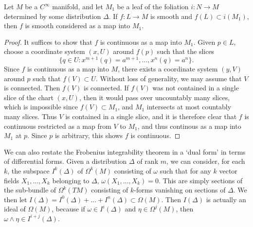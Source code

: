 \begin{theorem}
    Let $M$ be a $C^\infty$ manifold, and let $M_1$ be a leaf of the foliation $i: N \to M$ determined by some distribution $\Delta$. If $f: L \to M$ is smooth and $f(L) \subset i(M_1)$, then $f$ is smooth considered as a map into $M_1$.
\end{theorem}
\begin{proof}
    It suffices to show that $f$ is continuous as a map into $M_1$. Given $p \in L$, choose a coordinate system $(x,U)$ around $f(p)$ such that the slices
    \[ \{ q \in U : x^{m+1}(q) = a^{m+1}, \dots, x^n(q) = a^n \}. \]
    Since $f$ is continuous as a map into $M$, there exists a coordinate system $(y,V)$ around $p$ such that $f(V) \subset U$. Without loss of generality, we may assume that $V$ is connected. Then $f(V)$ is connected. If $f(V)$ was not contained in a single slice of the chart $(x,U)$, then it would pass over uncountably many slices, which is impossible since $f(V) \subset M_1$, and $M_1$ intersects at most countably many slices. Thus $V$ is contained in a single slice, and it is therefore clear that $f$ is continuous restricted as a map from $V$ to $M_1$, and thus continous as a map into $M_1$ at $p$. Since $p$ is arbitrary, this shows $f$ is continuous.
\end{proof}

We can also restate the Frobenius integrability theorem in a `dual form' in terms of differential forms. Given a distribution $\Delta$ of rank $m$, we can consider, for each $k$, the subspace $I^k(\Delta)$ of $\Omega^k(M)$ consisting of $\omega$ such that for any $k$ vector fields $X_1, \dots, X_k$ belonging to $\Delta$, $\omega(X_1, \dots, X_k) = 0$. This are simply sections of the sub-bundle of $\Omega^k(TM)$ consisting of $k$-forms vanishing on sections of $\Delta$. We then let $I(\Delta) = I^0(\Delta) + \dots + I^n(\Delta) \subset \Omega(M)$. Then $I(\Delta)$ is actually an ideal of $\Omega(M)$, because if $\omega \in I^i(\Delta)$ and $\eta \in \Omega^j(M)$, then $\omega \wedge \eta \in I^{i+j}(\Delta)$.


